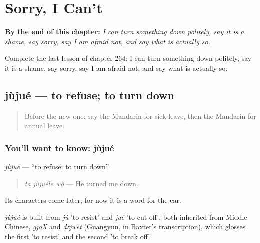 
\chapter{Sorry, I Can't}
\label{ch:zh-sorry-i-can-t}

\begin{chapteropening}
\textbf{By the end of this chapter:} \emph{I can turn something down politely, say it is a shame, say sorry, say I am afraid not, and say what is actually so.}

Complete the last lesson of chapter 264: I can turn something down politely, say it is a shame, say sorry, say I am afraid not, and say what is actually so.
\end{chapteropening}

\section[jùjué]{jùjué — to refuse; to turn down}

\label{lesson:ZH-C264-jujue}



\begin{quote}
Before the new one: say the Mandarin for sick leave, then the Mandarin for annual leave.
\end{quote}

\subsection*{You'll want to know: jùjué}
\emph{jùjué} — \textquotedblleft{}to refuse; to turn down\textquotedblright{}.

\begin{quote}
\emph{tā jùjuéle wǒ} — He turned me down.
\end{quote}

Its characters come later; for now it is a word for the ear.

\begin{cousinweb}
\emph{jùjué} is built from \emph{jù} 'to resist' and \emph{jué} 'to cut off', both inherited from Middle Chinese, \emph{gjoX} and \emph{dzjwet} (Guangyun, in Baxter's transcription), which glosses the first 'to resist' and the second 'to break off'.
\end{cousinweb}

